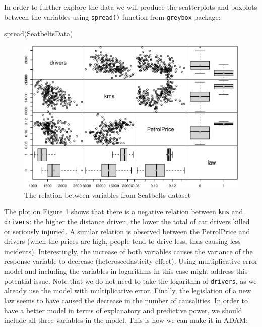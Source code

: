 \documentclass[
]{book}
\newenvironment{Shaded}{\begin{snugshade}}{\end{snugshade}}
\newcommand{\FunctionTok}[1]{\textcolor[rgb]{0.00,0.00,0.00}{#1}}
\newcommand{\NormalTok}[1]{#1}
\theoremstyle{definition}
\theoremstyle{definition}
\theoremstyle{definition}
\theoremstyle{definition}
\theoremstyle{remark}
\begin{document}
In order to further explore the data we will produce the scatterplots and boxplots between the variables using \texttt{spread()} function from \texttt{greybox} package:

\begin{Shaded}
\begin{Highlighting}[]
\FunctionTok{spread}\NormalTok{(SeatbeltsData)}
\end{Highlighting}
\end{Shaded}

\begin{figure}
\centering
\includegraphics{adam_files/figure-latex/driversSpread-1.pdf}
\caption{\label{fig:driversSpread}The relation between variables from Seatbelts dataset}
\end{figure}

The plot on Figure \ref{fig:driversSpread} shows that there is a negative relation between \texttt{kms} and \texttt{drivers}: the higher the distance driven, the lower the total of car drivers killed or seriously injuried. A similar relation is observed between the PetrolPrice and drivers (when the prices are high, people tend to drive less, thus causing less incidents). Interestingly, the increase of both variables causes the variance of the response variable to decrease (heteroscedasticity effect). Using multiplicative error model and including the variables in logarithms in this case might address this potential issue. Note that we do not need to take the logarithm of \texttt{drivers}, as we already use the model with multiplicative error. Finally, the legislation of a new law seems to have caused the decrease in the number of causalities. In order to have a better model in terms of explanatory and predictive power, we should include all three variables in the model. This is how we can make it in ADAM:
\end{document}
